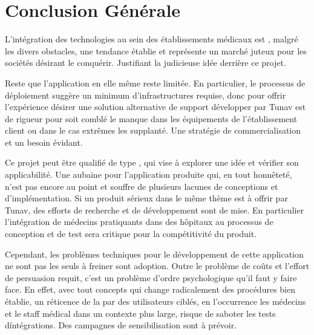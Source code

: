 
\chapter{Conclusion Générale}   

L'intégration des technologies au sein des établissements médicaux est ,
malgré les divers obstacles, une tendance établie et représente un
marché juteux pour les sociétés désirant le conquérir. Justifiant la
judicieuse idée derrière ce projet.

Reste que l'application en elle même reste limitée. En particulier, le
processus de déploiement  suggère un minimum d'infrastructures requise,
donc pour offrir l'expérience désirer une solution alternative de
support développer par Tunav est de rigueur pour soit comblé le manque
dans les équipements de l’établissement client ou dans le cas extrêmes
les supplanté. Une stratégie de commercialisation et un besoin évidant.

Ce projet peut être qualifié de type , qui vise à
explorer une idée et vérifier son applicabilité. Une aubaine pour
l'application produite qui, en tout honnêteté, n'est pas encore au point
et souffre de plusieurs lacunes de conceptions et d'implémentation. Si
un produit sérieux dans le même thème est à offrir par Tunav, des
efforts de recherche et de développement sont de mise. En particulier
l'intégration de médecins pratiquants dans des hôpitaux au processus de
conception et de test sera critique pour la compétitivité du produit.

Cependant, les problèmes techniques pour le développement de cette
application ne sont pas les seuls à freiner sont adoption. Outre le
problème de coûts  et l'effort de persuasion requit, c'est un problème
d'ordre psychologique qu'il faut y faire face. En effet, avec tout
concepts qui change radicalement des procédures bien établie, un
réticence de la par des utilisateurs ciblés, en l'occurrence les
médecins et le staff médical dans un contexte plus large, risque de
saboter les tests d\'intégrations. Des campagnes de sensibilisation sont
à prévoir.
